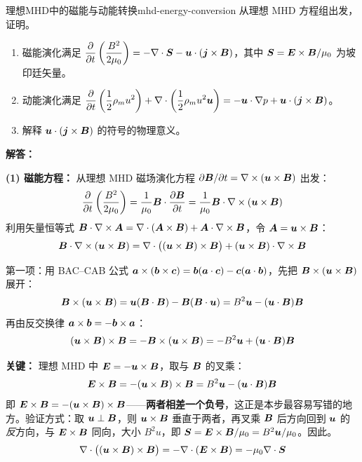 \begin{example}{理想MHD中的磁能与动能转换}{mhd-energy-conversion}
从理想 MHD 方程组出发，证明。
\begin{enumerate}[label=(\arabic*)]
\item 磁能演化满足 $\displaystyle\frac{\partial}{\partial t}\left(\frac{B^2}{2\mu_0}\right) = -\nabla\cdot\bm{S} - \bm{u}\cdot(\bm{j}\times\bm{B})$，其中 $\bm{S} = \bm{E}\times\bm{B}/\mu_0$ 为坡印廷矢量。
\item 动能演化满足 $\displaystyle\frac{\partial}{\partial t}\left(\frac{1}{2}\rho_m u^2\right) + \nabla\cdot\left(\frac{1}{2}\rho_m u^2\bm{u}\right) = -\bm{u}\cdot\nabla p + \bm{u}\cdot(\bm{j}\times\bm{B})$。
\item 解释 $\bm{u}\cdot(\bm{j}\times\bm{B})$ 的符号的物理意义。
\end{enumerate}
\tcblower
\textbf{解答：}

\textbf{(1) 磁能方程：}
从理想 MHD 磁场演化方程 $\partial\bm{B}/\partial t = \nabla\times(\bm{u}\times\bm{B})$ 出发：
\[
\frac{\partial}{\partial t}\left(\frac{B^2}{2\mu_0}\right) = \frac{1}{\mu_0}\bm{B}\cdot\frac{\partial\bm{B}}{\partial t} = \frac{1}{\mu_0}\bm{B}\cdot\nabla\times(\bm{u}\times\bm{B})
\]
利用矢量恒等式 $\bm{B}\cdot\nabla\times\bm{A} = \nabla\cdot(\bm{A}\times\bm{B}) + \bm{A}\cdot\nabla\times\bm{B}$，令 $\bm{A} = \bm{u}\times\bm{B}$：
\[
\bm{B}\cdot\nabla\times(\bm{u}\times\bm{B}) = \nabla\cdot\bigl((\bm{u}\times\bm{B})\times\bm{B}\bigr) + (\bm{u}\times\bm{B})\cdot\nabla\times\bm{B}
\]

第一项：用 BAC--CAB 公式 $\bm{a}\times(\bm{b}\times\bm{c})=\bm{b}(\bm{a}\cdot\bm{c})-\bm{c}(\bm{a}\cdot\bm{b})$，先把 $\bm{B}\times(\bm{u}\times\bm{B})$ 展开：
\[
\bm{B}\times(\bm{u}\times\bm{B}) = \bm{u}(\bm{B}\cdot\bm{B}) - \bm{B}(\bm{B}\cdot\bm{u}) = B^2\bm{u} - (\bm{u}\cdot\bm{B})\bm{B}
\]
再由反交换律 $\bm{a}\times\bm{b}=-\bm{b}\times\bm{a}$：
\[
(\bm{u}\times\bm{B})\times\bm{B} = -\bm{B}\times(\bm{u}\times\bm{B})
= -B^2\bm{u} + (\bm{u}\cdot\bm{B})\bm{B}
\]

\textbf{关键：} 理想 MHD 中 $\bm{E} = -\bm{u}\times\bm{B}$，取与 $\bm{B}$ 的叉乘：
\[
\bm{E}\times\bm{B} = -(\bm{u}\times\bm{B})\times\bm{B}
= B^2\bm{u} - (\bm{u}\cdot\bm{B})\bm{B}
\]
即 $\bm{E}\times\bm{B} = \mathbf{-}(\bm{u}\times\bm{B})\times\bm{B}$——\textbf{两者相差一个负号}，这正是本步最容易写错的地方。验证方式：取 $\bm{u}\perp\bm{B}$，则 $\bm{u}\times\bm{B}$ 垂直于两者，再叉乘 $\bm{B}$ 后方向回到 $\bm{u}$ 的\emph{反}方向，与 $\bm{E}\times\bm{B}$ 同向，大小 $B^2u$，即 $\bm{S}=\bm{E}\times\bm{B}/\mu_0 = B^2\bm{u}/\mu_0$。因此。
\[
\nabla\cdot\bigl((\bm{u}\times\bm{B})\times\bm{B}\bigr) = -\nabla\cdot(\bm{E}\times\bm{B}) = -\mu_0\nabla\cdot\bm{S}
\]


\end{example}
